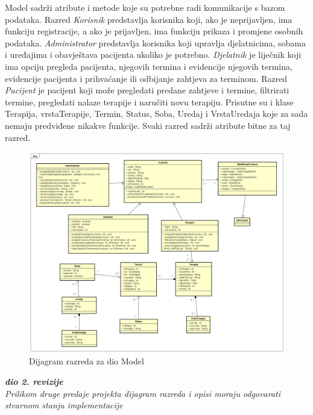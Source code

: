 			Model sadrži atribute i metode koje su potrebne radi komunikacije s bazom podataka. Razred \textit{Korisnik} predstavlja korisnika koji, ako je neprijavljen, ima funkciju registracije, a ako je prijavljen, ima funkciju prikaza i promjene osobnih podataka. \textit{Administrator} predstavlja korisnika koji upravlja djelatnicima, sobama i uređajima i obavještava pacijenta ukoliko je potrebno. \textit{Djelatnik} je liječnik koji ima opciju pregleda pacijenta, njegovih termina i evidencije njegovih termina, evidencije pacijenta i prihvaćanje ili odbijanje zahtjeva za terminom. Razred \textit{Pacijent} je pacijent koji može pregledati predane zahtjeve i termine, filtrirati termine, pregledati nalaze terapije i naručiti novu terapiju. Prisutne su i klase Terapija, vrstaTerapije, Termin, Status, Soba, Uredaj i VrstaUredaja koje za sada nemaju predviđene nikakve funkcije. Svaki razred sadrži atribute bitne za taj razred.
			
			\begin{figure}[H]
				\includegraphics[scale=0.3]{slike/Dijagram_razreda_1.PNG} %
				\centering
				\caption{Dijagram razreda za dio Model}
				\label{fig:dijagram_razreda_3}
			\end{figure}
			
			
			
			\textbf{\textit{dio 2. revizije}}\\			
			
			\textit{Prilikom druge predaje projekta dijagram razreda i opisi moraju odgovarati stvarnom stanju implementacije}
			
